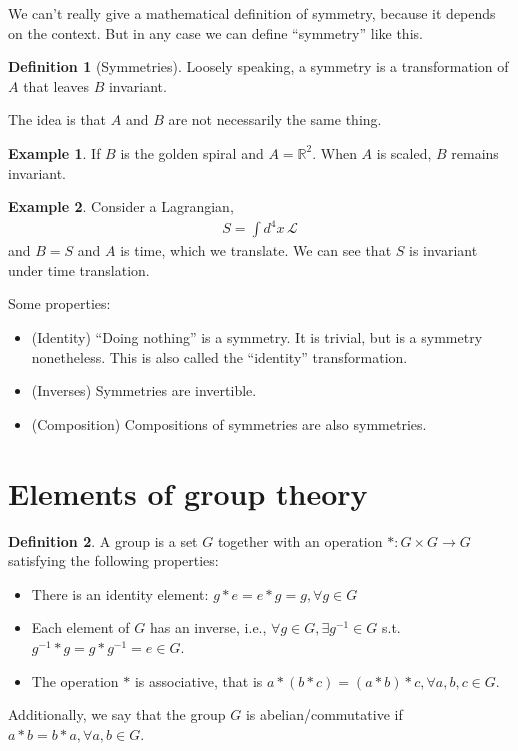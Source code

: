 \documentclass{book}
\theoremstyle{definition}
\newtheorem{defn}{Definition}[section]
\newtheorem{exmp}{Example}[section]
\newcommand{\lag}{\mathcal{L}}
\begin{document}
We can't really give a mathematical definition of symmetry, because it depends on the context. But in any case we can define ``symmetry'' like this.

\begin{defn}[Symmetries]
	Loosely speaking, a symmetry is a transformation of $A$ that leaves $B$ invariant. 
\end{defn}

The idea is that $A$ and $B$ are not necessarily the same thing. 

\begin{exmp}
	If $B$ is the golden spiral and $A = \mathbb{R}^2$. When $A$ is scaled, $B$ remains invariant. 
\end{exmp} 

\begin{exmp}
	Consider a Lagrangian,
	\begin{align}
	S = \int d^4x\,\lag
	\end{align}
	and $B = S$  and $A$ is time, which we translate. We can see that $S$ is invariant under time translation. 
\end{exmp}


Some properties:
\begin{itemize}
	\item (Identity) ``Doing nothing'' is a symmetry. It is trivial, but is a symmetry nonetheless. This is also called the ``identity'' transformation.
	
	\item (Inverses) Symmetries are invertible. 
	
	\item (Composition) Compositions of symmetries are also symmetries. 
\end{itemize}



\section{Elements of group theory}


\begin{defn}
	A group is a set $G$ together with an operation $* : G\times G \to G$ satisfying the following properties:
	\begin{itemize}
		\item There is an identity element: $g*e = e*g = g, \forall g\in G$
		
		\item Each element of $G$ has an inverse, i.e., $\forall g\in G, \exists g^{-1}\in G$ s.t. $g^{-1}* g = g * g^{-1} = e \in G$.
		
		
		\item The operation $*$ is associative, that is  $a*(b*c) = (a*b)*c, \forall a,b,c\in G$.
	\end{itemize}

	Additionally, we say that the group $G$ is abelian/commutative if $a*b = b*a, \forall a,b\in G$. 
\end{defn}
\end{document}
